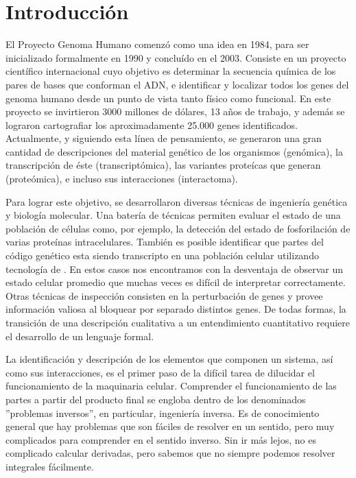 \chapter{Introducción}


El Proyecto Genoma Humano comenzó como una idea en 1984, para ser inicializado formalmente en 1990 y concluído en el 2003. Consiste en un proyecto científico internacional cuyo objetivo es determinar la secuencia química de los pares de bases que conforman el ADN, e identificar y localizar todos los genes del genoma humano desde un punto de vista tanto físico como funcional.  En este proyecto se invirtieron 3000 millones de dólares, 13 años de trabajo, y además se lograron cartografiar los aproximadamente 25.000 genes identificados. Actualmente, y siguiendo esta línea de pensamiento, se generaron una gran cantidad de descripciones del material genético de los organismos (genómica), la transcripción de éste (transcriptómica), las variantes proteícas que generan (proteómica), e incluso sus interacciones (interactoma)\cite{Cardelli2007}. 

Para lograr este objetivo, se desarrollaron diversas técnicas de ingeniería genética y biología molecular. Una batería de técnicas permiten evaluar el estado de una población de células como, por ejemplo, la detección del estado de fosforilación de varias proteínas intracelulares. También es posible identificar que partes del código genético esta siendo transcripto en una población celular utilizando tecnología de . En estos casos nos encontramos con la desventaja de observar un estado celular promedio que muchas veces es difícil de interpretar correctamente. Otras técnicas de inspección consisten en la perturbación de genes y provee información valiosa al bloquear por separado distintos genes\cite{Cardelli2007}. De todas formas, la transición de una descripción cualitativa a un entendimiento cuantitativo requiere el desarrollo de un lenguaje formal\cite{Lazebnik2002}.



La identificación y descripción de los elementos que componen un sistema, así como sus interacciones, es el primer paso de la difícil tarea de dilucidar el funcionamiento de la maquinaria celular\cite{GreccoBastiaens2009}. Comprender el funcionamiento de las partes a partir del producto final se engloba dentro de los denominados ''problemas inversos'', en particular, ingeniería inversa. Es de conocimiento general que hay problemas que son fáciles de resolver en un sentido, pero muy complicados para comprender en el sentido inverso. Sin ir más lejos, no es complicado calcular derivadas, pero sabemos que no siempre podemos resolver integrales fácilmente\cite{Milotti2013}.

